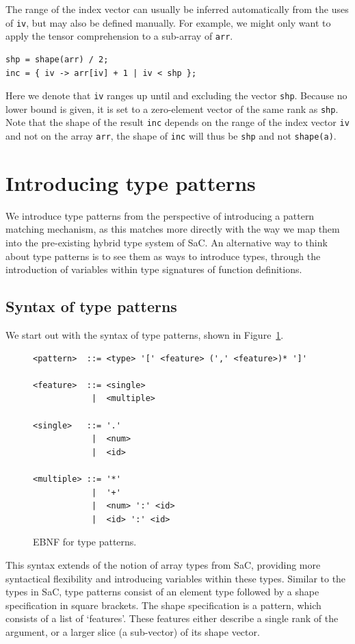 \documentclass[sigconf,screen]{acmart}
\begin{document}
The range of the index vector can usually be inferred automatically from the uses of \texttt{iv}, but may also be defined manually.
For example, we might only want to apply the tensor comprehension to a sub-array of \texttt{arr}.

\begin{lstlisting}
shp = shape(arr) / 2;
inc = { iv -> arr[iv] + 1 | iv < shp };
\end{lstlisting}

Here we denote that \texttt{iv} ranges up until and excluding the vector \texttt{shp}.
Because no lower bound is given, it is set to a zero-element vector of the same rank as \texttt{shp}.
Note that the shape of the result \texttt{inc} depends on the range of the index vector \texttt{iv} and not on the array \texttt{arr}, the shape of \texttt{inc} will thus be \texttt{shp} and not \texttt{shape(a)}.

\section{Introducing type patterns}
We introduce type patterns from the perspective of introducing a pattern matching mechanism, as this matches more directly with the way we map them into the pre-existing hybrid type system of SaC.
An alternative way to think about type patterns is to see them as ways to introduce types, through the introduction of variables within type signatures of function definitions.

\subsection{Syntax of type patterns}
We start out with the syntax of type patterns, shown in Figure~\ref{fig:syntax}.

\begin{figure}[!ht]
\begin{verbatim}
<pattern>  ::= <type> '[' <feature> (',' <feature>)* ']'

<feature>  ::= <single>
            |  <multiple>

<single>   ::= '.'
            |  <num>
            |  <id>

<multiple> ::= '*'
            |  '+'
            |  <num> ':' <id>
            |  <id> ':' <id>
\end{verbatim}
\caption{EBNF for type patterns.}
\label{fig:syntax}
\end{figure}

This syntax extends of the notion of array types from SaC, providing more syntactical flexibility and introducing variables within these types.
Similar to the types in SaC, type patterns consist of an element type followed by a shape specification in square brackets.
The shape specification is a pattern, which consists of a list of `features'.
These features either describe a single rank of the argument, or a larger slice (a sub-vector) of its shape vector.
\end{document}

